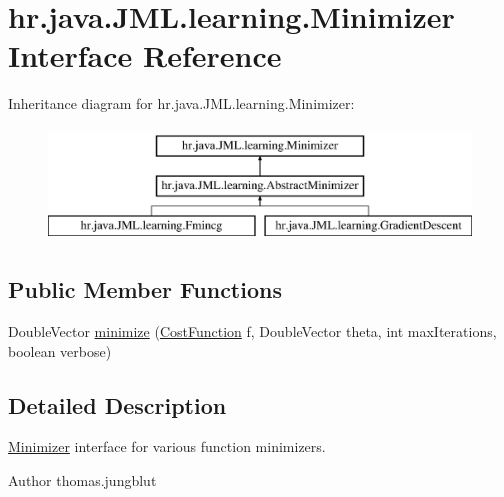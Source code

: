 \hypertarget{interfacehr_1_1java_1_1_j_m_l_1_1learning_1_1_minimizer}{\section{hr.\+java.\+J\+M\+L.\+learning.\+Minimizer Interface Reference}
\label{interfacehr_1_1java_1_1_j_m_l_1_1learning_1_1_minimizer}
}
Inheritance diagram for hr.\+java.\+J\+M\+L.\+learning.\+Minimizer\+:\begin{figure}[H]
\begin{center}
\leavevmode
\includegraphics[height=3.000000cm]{interfacehr_1_1java_1_1_j_m_l_1_1learning_1_1_minimizer}
\end{center}
\end{figure}
\subsection*{Public Member Functions}
\begin{DoxyCompactItemize}
\item 
Double\+Vector \hyperlink{interfacehr_1_1java_1_1_j_m_l_1_1learning_1_1_minimizer_a4b640a5d2cc5293ccc47736a798c6ab7}{minimize} (\hyperlink{interfacehr_1_1java_1_1_j_m_l_1_1cost_1_1_cost_function}{Cost\+Function} f, Double\+Vector theta, int max\+Iterations, boolean verbose)
\end{DoxyCompactItemize}


\subsection{Detailed Description}
\hyperlink{interfacehr_1_1java_1_1_j_m_l_1_1learning_1_1_minimizer}{Minimizer} interface for various function minimizers.

\begin{DoxyAuthor}{Author}
thomas.\+jungblut 
\end{DoxyAuthor}



